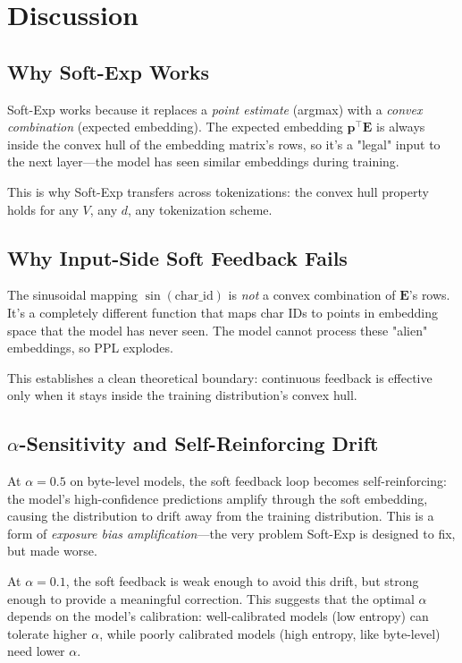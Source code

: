 \documentclass[11pt]{article}
\begin{document}
\section{Discussion}
\label{sec:discussion}

\subsection{Why Soft-Exp Works}

Soft-Exp works because it replaces a \emph{point estimate} (argmax) with a \emph{convex combination} (expected embedding). The expected embedding $\mathbf{p}^\top \mathbf{E}$ is always inside the convex hull of the embedding matrix's rows, so it's a "legal" input to the next layer—the model has seen similar embeddings during training.

This is why Soft-Exp transfers across tokenizations: the convex hull property holds for any $V$, any $d$, any tokenization scheme.

\subsection{Why Input-Side Soft Feedback Fails}

The sinusoidal mapping $\sin(\text{char\_id})$ is \emph{not} a convex combination of $\mathbf{E}$'s rows. It's a completely different function that maps char IDs to points in embedding space that the model has never seen. The model cannot process these "alien" embeddings, so PPL explodes.

This establishes a clean theoretical boundary: continuous feedback is effective only when it stays inside the training distribution's convex hull.

\subsection{$\alpha$-Sensitivity and Self-Reinforcing Drift}

At $\alpha=0.5$ on byte-level models, the soft feedback loop becomes self-reinforcing: the model's high-confidence predictions amplify through the soft embedding, causing the distribution to drift away from the training distribution. This is a form of \emph{exposure bias amplification}—the very problem Soft-Exp is designed to fix, but made worse.

At $\alpha=0.1$, the soft feedback is weak enough to avoid this drift, but strong enough to provide a meaningful correction. This suggests that the optimal $\alpha$ depends on the model's calibration: well-calibrated models (low entropy) can tolerate higher $\alpha$, while poorly calibrated models (high entropy, like byte-level) need lower $\alpha$.
\end{document}
